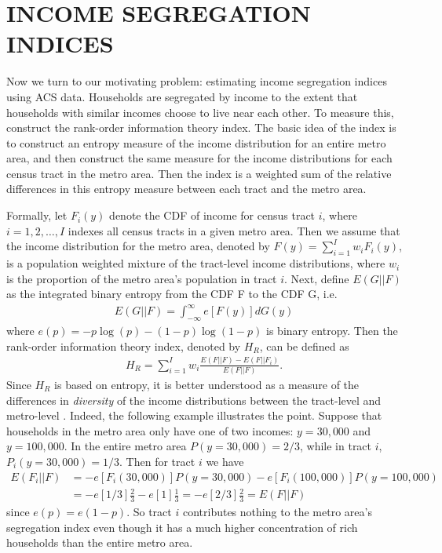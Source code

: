 \documentclass[12pt]{article}
\begin{document}
\section{INCOME SEGREGATION INDICES}\label{sec:index}
Now we turn to our motivating problem: estimating income segregation indices using ACS data. Households are segregated by income to the extent that households with similar incomes choose to live near each other. To measure this, \citet{reardon2011measures,reardon2011income} construct the rank-order information theory index. The basic idea of the index is to construct an entropy measure of the income distribution for an entire metro area, and then construct the same measure for the income distributions for each census tract in the metro area. Then the index is a weighted sum of the relative differences in this entropy measure between each tract and the metro area.

Formally, let $F_i(y)$ denote the CDF of income for census tract $i$, where $i=1,2,\dots,I$ indexes all census tracts in a given metro area. Then we assume that the income distribution for the metro area, denoted by $F(y) = \sum_{i=1}^Iw_iF_i(y)$, is a population weighted mixture of the tract-level income distributions, where $w_i$ is the proportion of the metro area's population in tract $i$. Next, define $E(G||F)$ as the integrated binary entropy from the CDF F to the CDF G, i.e.
\begin{align}
E(G||F) = \int_{-\infty}^{\infty}e[F(y)]dG(y) \label{eq:int.entropy}
\end{align}
where $e(p) = -p\log(p) -(1-p)\log(1-p)$ is binary entropy. Then the rank-order information theory index, denoted by $H_R$, can be defined as
\begin{align}
H_R = \sum_{i=1}^Iw_i\frac{E(F||F) - E(F||F_i)}{E(F||F)} \label{eq:info}.
\end{align}
Since $H_R$ is based on entropy, it is better understood as a measure of the differences in \emph{diversity} of the income distributions between the tract-level and metro-level \citep{roberto2015divergence}. Indeed, the following example illustrates the point. Suppose that households in the metro area only have one of two incomes: $y=30,000$ and $y=100,000$. In the entire metro area $P(y=30,000) = 2/3$, while in tract $i$, $P_i(y=30,000) = 1/3$. Then for tract $i$ we have
\begin{align*}
  E(F_i||F) &= -e[F_i(30,000)] P(y=30,000) - e[F_i(100,000)] P(y=100,000) \\
            &= -e[1/3] \frac{2}{3} - e[1] \frac{1}{3} = -e[2/3] \frac{2}{3} = E(F||F)
\end{align*}
since $e(p) = e(1-p)$. So tract $i$ contributes nothing to the metro area's segregation index even though it has a much higher concentration of rich households than the entire metro area.
\end{document}
